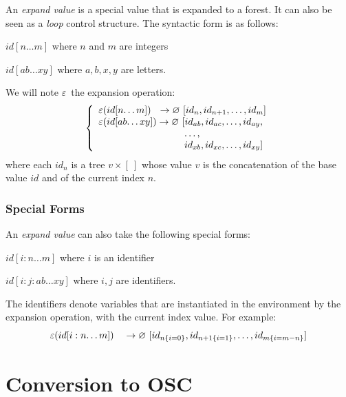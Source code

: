 \documentclass[runningheads]{llncs}
\newcommand{\forest}	{\ensuremath{\varnothing}}
\newcommand{\etc}		{\ensuremath{\text{…}}}
\newcommand{\emptyf}	{\ensuremath{[\ ]}}
\newcommand{\nexpand}	{\ensuremath{\varepsilon}}
\newcommand{\ulb}		{\hspace*{31.5mm}}
\begin{document}
An \emph{expand value} is a special value that is expanded to a forest. It can also be seen as a \emph{loop} control structure. The syntactic form is as follows:
\begin{description}
\item $id[n\etc m]$ 	where $n$ and $m$ are integers
\item $id[ab\etc xy]$ where $a,b,x,y$ are letters.
\end{description}
We will note \nexpand\ the expansion operation:
\[
\left\{
\begin{array}{l}
	\nexpand(id[n\etc m])   \ \ \to \forest \ [id_n,id_{n+1},\etc ,id_m] \\
	\nexpand(id[ab\etc xy]) \to \forest \ [id_{ab},id_{ac},\etc ,id_{ay}, \\
	\ulb \etc ,\\
	\ulb id_{xb},id_{xc},\etc ,id_{xy}]
\end{array}
\right.
\]
where each $id_n$ is a tree $v \times \emptyf$ whose value $v$ is the concatenation of the base value $id$ and of the current index $n$.

\subsubsection{Special Forms}

An \emph{expand value} can also take the following special forms: 
\begin{description}
\item $id[i:n\etc m]$ 	where $i$ is an identifier
\item $id[i:j:ab\etc xy]$ where $i,j$ are identifiers.
\end{description}
The identifiers denote variables that are instantiated in the environment by the expansion operation, with the current index value. For example:
\[
	\nexpand(id[i:n\etc m])   \quad \to \forest \ [id_{n\{i=0\}},id_{n+1\{i=1\}},\etc ,id_{m\{i=m-n\}}] \\
\]

\section{Conversion to OSC}\label{sslash}
\end{document}
